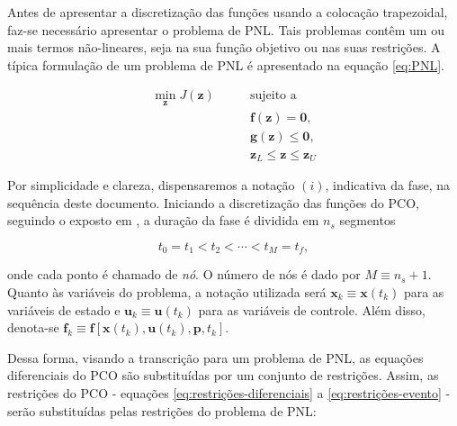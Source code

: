 Antes de apresentar a discretização das funções usando a colocação trapezoidal, faz-se necessário apresentar o problema de PNL. Tais problemas contêm um ou mais termos não-lineares, seja na sua função objetivo ou nas suas restrições. A típica formulação de um problema de PNL é apresentado na equação \ref{eq:PNL}.

\begin{equation}
\label{eq:PNL}
    \begin{aligned}
        \min_\mathbf{z} J(\mathbf{z}) \qquad &\text{sujeito a} \\
        & \mathbf{f}(\mathbf{z}) = \mathbf{0}, \\
        & \mathbf{g}(\mathbf{z}) \leq \mathbf{0}, \\
        & \mathbf{z}_L \leq \mathbf{z} \leq \mathbf{z}_U
    \end{aligned}
\end{equation}

Por simplicidade e clareza, dispensaremos a notação $(i)$, indicativa da fase, na sequência deste documento. Iniciando a discretização das funções do PCO, seguindo o exposto em \cite{betts_practical_2010}, a duração da fase é dividida em $n_s$ segmentos

\begin{equation}
    \label{eq:tempo-disc}
    t_0 = t_1 < t_2 < \cdots < t_M = t_f,
\end{equation}

\noindent onde cada ponto é chamado de \textit{nó}. O número de nós é dado por $M \equiv n_s + 1$. Quanto às variáveis do problema, a notação utilizada será $\mathbf{x}_k \equiv \mathbf{x}(t_k)$ para as variáveis de estado e $\mathbf{u}_k \equiv \mathbf{u}(t_k)$ para as variáveis de controle. Além disso, denota-se $\mathbf{f}_k \equiv \mathbf{f} \left[ \mathbf{x}(t_k), \mathbf{u}(t_k), \mathbf{p}, t_k \right]$.

Dessa forma, visando a transcrição para um problema de PNL, as equações diferenciais do PCO são substituídas por um conjunto de restrições. Assim, as restrições do PCO - equações \ref{eq:restrições-diferenciais} a \ref{eq:restrições-evento} - serão substituídas pelas restrições do problema de PNL:

